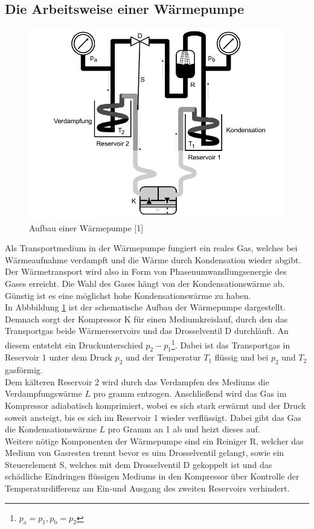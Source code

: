 \subsection{Die Arbeitsweise einer Wärmepumpe}
\begin{figure}
    \centering
    \includegraphics[scale=0.4]{aufbau.pdf}
    \caption{Aufbau einer Wärmepumpe [1]}
    \label{fig:aufbau}
\end{figure}
Als Transportmedium in der Wärmepumpe fungiert ein reales Gas,
welches bei Wärmeaufnahme verdampft und die Wärme durch Kondensation wieder abgibt. Der Wärmetransport wird also in Form 
von Phasenumwandlungsenergie des Gases erreicht.
Die Wahl des Gases hängt von der Kondensationswärme ab. Günstig ist es eine möglichst hohe Kondensationswärme zu haben. \\
In Abbbildung \ref{fig:aufbau} ist der schematische Aufbau der Wärmepumpe dargestellt.
Demnach sorgt der Kompressor K für einen Mediumkreislauf, durch den das Transportgas beide Wärmereservoirs und das Drosselventil D durchläuft.
An diesem entsteht ein Druckunterschied $p_2-p_1$\footnote{$p_\text{a}=p_1, p_\text{b}=p_2$}. Dabei ist das Transportgas in Reservoir 1 unter dem Druck $p_2$
und der Temperatur $T_1$ flüssig und bei $p_2$ und $T_2$ gasförmig.\\
Dem kälteren Reservoir 2 wird durch das Verdampfen des Mediums die Verdampfungswärme $L$ pro gramm entzogen. 
Anschließend wird das Gas im Kompressor adiabatisch komprimiert, wobei es sich stark erwärmt und der Druck soweit ansteigt, bis es sich im Reservoir 1
wieder verflüssigt. Dabei gibt das Gas die Kondensationswärme $L$ pro Gramm an 1 ab und heizt dieses auf.\\
Weitere nötige Komponenten der Wärmepumpe sind ein Reiniger R, welcher das Medium von Gasresten trennt bevor es uim Drosselventil gelangt, sowie ein Steuerelement S,
welches mit dem Drosselventil D gekoppelt ist und das schädliche Eindringen flüssigen Mediums in den Kompressor über Kontrolle der Temperaturdifferenz
am Ein-und Ausgang des zweiten Reservoirs verhindert. 
